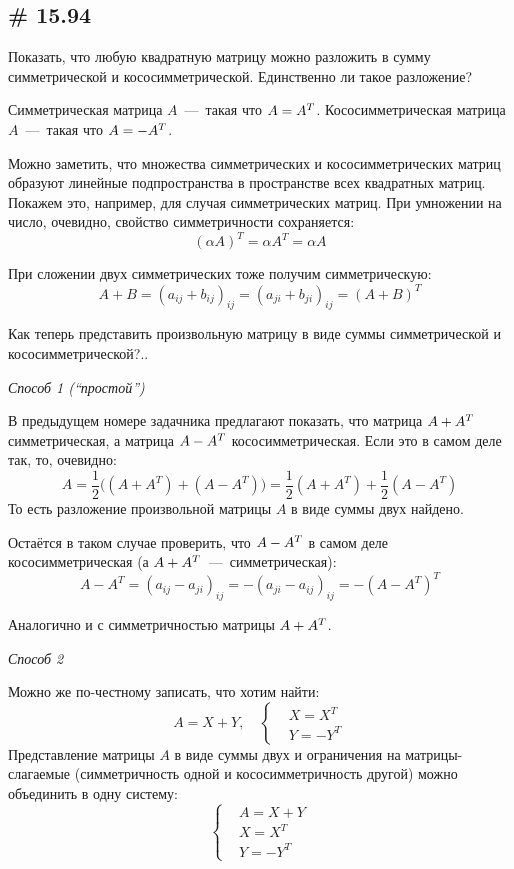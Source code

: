 \documentclass[a4paper,12pt]{article}
\begin{document}
  
  \subsection{\# 15.94}
  
  Показать, что любую квадратную матрицу можно разложить в сумму симметрической и кососимметрической.
  Единственно ли такое разложение?
  
  \begin{solution}
    Симметрическая матрица $A$~---~такая что $A \hm= A^T$.
    Кососимметрическая матрица $A$~---~такая что $A \hm= -A^T$.
    
    Можно заметить, что множества симметрических и кососимметрических матриц образуют линейные подпространства в пространстве всех квадратных матриц.
    Покажем это, например, для случая симметрических матриц.
    При умножении на число, очевидно, свойство симметричности сохраняется:
    \[
      (\alpha A)^T = \alpha A^T = \alpha A
    \]
    
    При сложении двух симметрических тоже получим симметрическую:
    \[
      A + B = (a_{ij} + b_{ij})_{ij} = (a_{ji} + b_{ji})_{ij} = (A + B)^T
    \]
    
    Как теперь представить произвольную матрицу в виде суммы симметрической и кососимметрической?..
    
    \bigskip
    
    \emph{Способ 1 (``простой'')}
    
    В предыдущем номере задачника предлагают показать, что матрица $A \hm+ A^T$ симметрическая, а матрица $A \hm- A^T$ кососимметрическая.
    Если это в самом деле так, то, очевидно:
    \[
      A = \frac{1}{2} \bigl((A + A^T) + (A - A^T)\bigr) = \frac{1}{2} (A + A^T) + \frac{1}{2} (A - A^T)
    \]
    То есть разложение произвольной матрицы $A$ в виде суммы двух найдено.
    
    Остаётся в таком случае проверить, что $A \hm- A^T$ в самом деле кососимметрическая (а $A \hm+ A^T$~---~симметрическая):
    \[
      A - A^T = (a_{ij} - a_{ji})_{ij} = -(a_{ji} - a_{ij})_{ij} = -(A - A^T)^T
    \]
    
    Аналогично и с симметричностью матрицы $A \hm+ A^T$.
    
    \bigskip
    
    \emph{Способ 2}
    
    Можно же по-честному записать, что хотим найти:
    \[
      A = X + Y,\quad
      \left\{
        \begin{aligned}
          &X = X^T\\
          &Y = -Y^T
        \end{aligned}
      \right.
    \]
    Представление матрицы $A$ в виде суммы двух и ограничения на матрицы-слагаемые (симметричность одной и кососимметричность другой) можно объединить в одну систему:
    \[
      \left\{
        \begin{aligned}
          &A = X + Y\\
          &X = X^T\\
          &Y = -Y^T
        \end{aligned}
      \right.
    \]
    

\end{solution}
\end{document}
